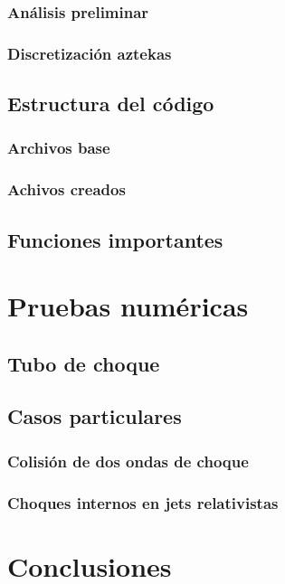 \documentclass[letterpaper,12pt,oneside]{book}
\begin{document}
        \subsection{Análisis preliminar}
        \subsection{Discretización aztekas}
        \section{Estructura del código}
        \subsection{Archivos base}
        \subsection{Achivos creados}
    \section{Funciones importantes}
    
\chapter{Pruebas numéricas}
    \section{Tubo de choque}
    \section{Casos particulares}
        \subsection{Colisión de dos ondas de choque}
        \subsection{Choques internos en jets relativistas}
    
\chapter{Conclusiones}  

%
%

\backmatter%
\end{document}
